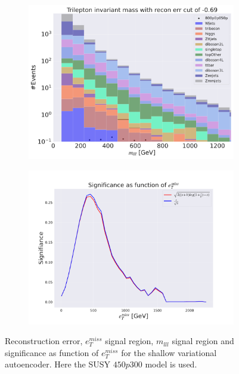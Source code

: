 \begin{figure}[H]
    \hfill
    \begin{subfigure}{.49\textwidth}
        \includegraphics[width=\textwidth]{Figures/VAE_testing/small/3lep/b_data_recon_big_rm3_feats_sig_800p0p050p_mlll_recon_errcut_-0.69.pdf}
        \caption{}
        \label{fig:VAE_3lep_small_mlll_800_2}
    \end{subfigure}
    \hfill   
    \begin{subfigure}{.49\textwidth}
        \includegraphics[width=\textwidth]{Figures/VAE_testing/small/3lep/significance_etmiss_800p0p050p_-0.6856921439167579.pdf}
        \caption{}
        \label{fig:VAE_3lep_small_signi_800_2}
    \end{subfigure}
    \hfill      
    \caption[3lep shallow network | $800p50$ | VAE | 2]{Reconstruction error, $e_T^{miss}$ signal region, $m_{lll}$ signal region and significance as function of 
    $e_T^{miss}$ for the shallow variational autoencoder. Here the SUSY $450p300$ model is used.}
    \label{fig:VAE_3lep_small_rec_sig_signi_800_2}
\end{figure}












